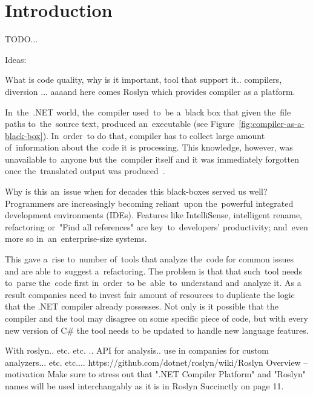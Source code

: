 \documentclass[
  digital, %
  table,   %
  lof,     %
  lot,     %
  oneside,
]{fithesis3}
\begin{document}
\chapter{Introduction}
TODO...

Ideas:

What is code quality, why is it important, tool that support it.. compilers, diversion ... aaaand here comes Roslyn which provides compiler as a platform.  

In~the~.NET world, the~compiler used~to~be a~black box that given the~file paths to~the~source text, produced an~executable (see Figure~\ref{fig:compiler-as-a-black-box}). In~order~to do that, compiler has to collect large amount of~information about the~code it is processing. This knowledge, however, was unavailable to~anyone but the~compiler itself and it was immediately forgotten once the~translated output was produced~\cite{roslyn-overview-github}. 

Why is this an~issue when for decades this black-boxes served us well? Programmers are increasingly becoming reliant~upon the~powerful integrated development environments (IDEs). Features like IntelliSense, intelligent rename, refactoring or~"Find all references" are key~to~developers' productivity; and~even more so in~an~enterprise-size systems. 

This gave a~rise to~number of~tools that analyze the~code for common issues and are able to~suggest a~refactoring. The problem is that that such~tool needs to~parse the~code first in~order~to be~able~to~understand and~analyze it. As a result companies need to invest fair amount of resources to duplicate the logic that the .NET compiler already possesses. Not only is it possible that the compiler and the tool may disagree on some specific piece of code, but with every new version of C\# the tool needs to be updated to handle new language features\cite{dot-net-development-using-the-compiler-api}.

With roslyn.. etc. etc. .. API for analysis.. use in companies for custom analyzers... etc. etc....
 https://github.com/dotnet/roslyn/wiki/Roslyn Overview -- motivation
Make sure to stress out that ".NET Compiler Platform" and "Roslyn" names will be used interchangably as it is in Roslyn Succinctly on page 11.
\end{document}
